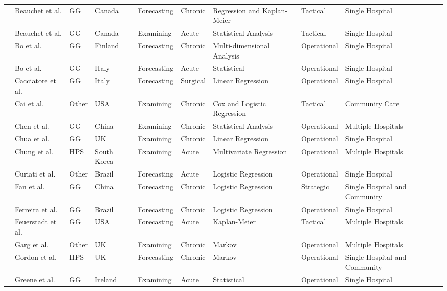 \documentclass[thesis.tex]{subfiles}
\begin{document}
\begin{landscape}
\begin{table}[H]
{\begin{tabular}{@{}llllllllll@{}}
    \cite{Beauchet2018} & Beauchet et al. & GG & Canada  & Forecasting & Chronic & Regression and Kaplan-Meier & Tactical& Single Hospital \\
    \cite{Beauchet2021} & Beauchet et al. & GG & Canada  & Examining & Acute & Statistical Analysis & Tactical & Single Hospital \\
    \cite{Bo2015} & Bo et al. & GG & Finland & Forecasting & Chronic & Multi-dimensional Analysis & Operational & Single Hospital \\
    \cite{Bo2016} & Bo et al. & GG & Italy & Forecasting & Acute & Statistical & Operational & Single Hospital \\
    \cite{Cacciatore2012} & Cacciatore et al. & GG & Italy & Forecasting& Surgical   &Linear Regression  & Operational&Single Hospital \\ 
    \cite{Cai2009} & Cai et al. & Other & USA &Examining & Chronic & Cox and Logistic Regression & Tactical & Community Care\\
    \cite{Chen2020} & Chen et al. & GG & China & Examining& Chronic& Statistical Analysis & Operational   & Multiple Hospitals \\
    \cite{Chua2007} & Chua et al. & GG & UK & Examining & Chronic & Linear Regression & Operational & Single Hospital \\
    \cite{Chung2010} & Chung et al. & HPS & South Korea & Examining & Acute & Multivariate Regression & Operational & Multiple Hospitals \\
    \cite{Curiati2020} & Curiati et al. & Other & Brazil & Forecasting & Acute & Logistic Regression & Operational & Single Hospital \\
    \cite{Fan2021} & Fan et al. & GG & China & Forecasting & Chronic & Logistic Regression & Strategic & Single Hospital and Community \\
    \cite{Ferreira2019} & Ferreira et al. & GG & Brazil & Forecasting & Chronic & Logistic Regression & Operational & Single Hospital \\
    \cite{Feuerstadt2022} & Feuerstadt et al. & GG & USA & Forecasting & Acute & Kaplan-Meier & Tactical & Multiple Hospitals \\
    \cite{Garg2011} & Garg et al. & Other & UK & Examining & Chronic & Markov  & Operational & Multiple Hospitals \\
    \cite{Gordon2} & Gordon et al. & HPS & UK & Forecasting & Chronic & Markov & Operational& Single Hospital and Community \\
    \cite{Greene2001} & Greene et al. & GG & Ireland & Examining & Acute & Statistical & Operational & Single Hospital \\

\end{tabular}}
\end{table}
\end{landscape}
\end{document}
